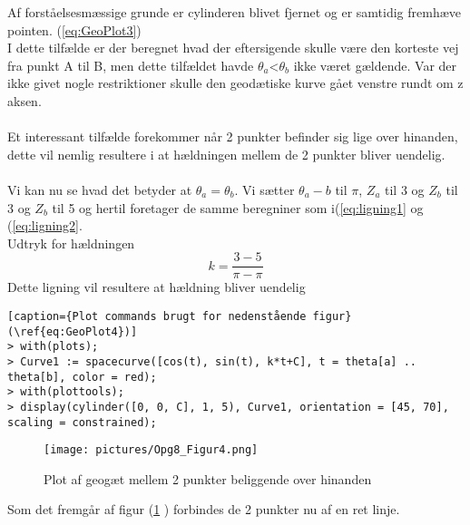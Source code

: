 Af forståelsesmæssige grunde er cylinderen blivet fjernet og er samtidig fremhæve pointen. (\ref{eq:GeoPlot3})
\\
I dette tilfælde er der beregnet hvad der eftersigende skulle være den korteste vej fra punkt A til B, men dette tilfældet havde $\theta_a$<$\theta_b$ ikke været gældende. Var der ikke givet nogle restriktioner skulle den geodætiske kurve gået venstre rundt om z aksen.
\\
\\
Et interessant tilfælde forekommer når 2 punkter befinder sig lige over hinanden, dette vil nemlig resultere i at hældningen mellem de 2 punkter bliver uendelig.
\\
\\
Vi kan nu se hvad det betyder at $\theta_a=\theta_b$. Vi sætter $\theta_a-b$ til $\pi$, $Z_a$ til 3 og $Z_b$ til 3 og $Z_b$ til 5 og hertil foretager de samme beregniner som i(\ref{eq:ligning1} og (\ref{eq:ligning2}.
\\
Udtryk for hældningen
\begin{equation}
k=\frac{3-5}{\pi-\pi}
\end{equation}
Dette ligning vil resultere at hældning bliver uendelig
\begin{lstlisting}[caption={Plot commands brugt for nedenstående figur}(\ref{eq:GeoPlot4})] 
> with(plots);
> Curve1 := spacecurve([cos(t), sin(t), k*t+C], t = theta[a] .. theta[b], color = red);
> with(plottools);
> display(cylinder([0, 0, C], 1, 5), Curve1, orientation = [45, 70], scaling = constrained);
\end{lstlisting}
\begin{figure}[h]
\center
\texttt{[image: pictures/Opg8\_Figur4.png]}
\caption{Plot af geogæt mellem 2 punkter beliggende over hinanden}
\label{eq:GeoPlot4}
\end{figure}
Som det fremgår af figur (\ref{eq:GeoPlot4} ) forbindes de 2 punkter nu af en ret linje.

